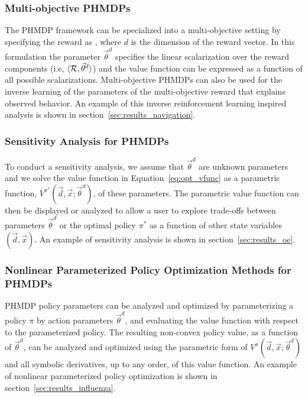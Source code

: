 \subsubsection{Multi-objective PHMDPs}

The PHMDP framework can be specialized into a multi-objective setting by specifying the reward as {\footnotesize \MORewardFunc}, where {\footnotesize $ d $} is the dimension of the reward vector. In this formulation the parameter {\footnotesize $ \vec{\theta}^{d} $} specifies the linear scalarization over the reward components (i.e, {\footnotesize $\langle \mathcal{R}, \vec{\theta}^{d} \rangle$}) and the value function can be expressed as a function of all possible scalarizations. Multi-objective PHMDPs can also be used for the inverse learning of the parameters of the multi-objective reward that explains observed behavior. An example of this inverse reinforcement learning inspired analysis is shown in section~\ref{sec:results_navigation}.

\subsubsection{Sensitivity Analysis for PHMDPs}

To conduct a sensitivity analysis, we assume that {\footnotesize $\vec{\theta}^{d}$} are unknown parameters and we solve the value function in Equation~\eqref{eq:opt_vfunc} as a parametric function, {\footnotesize $V^{\pi^{*}}(\vec{d}, \vec{x}; \vec{\theta}^{d})$}, of these parameters. The parametric value function can then be displayed or analyzed to allow a user to explore trade-offs between parameters {\footnotesize $\vec{\theta}^{d}$} or the optimal policy {\footnotesize $ \pi^{*} $} as a function of other state variables {\footnotesize $(\vec{d}, \vec{x})$}. An example of sensitivity analysis is shown in section~\ref{sec:results_oe}.

\subsubsection{Nonlinear Parameterized Policy Optimization Methods for PHMDPs}

PHMDP policy parameters can be analyzed and optimized by parameterizing a policy {\footnotesize $\pi$} by action parameters {\footnotesize $\vec{\theta}^{d}$}, and evaluating the value function with respect to the parameterized policy. The resulting non-convex policy value, as a function of {\footnotesize $\vec{\theta}^{d}$}, can be analyzed and optimized using the parametric form of {\footnotesize $V^{\pi}(\vec{d}, \vec{x}; \vec{\theta}^{d})$} and all symbolic derivatives, up to any order, of this value function. An example of nonlinear parameterized policy optimization is shown in section~\ref{sec:results_influenza}. 


